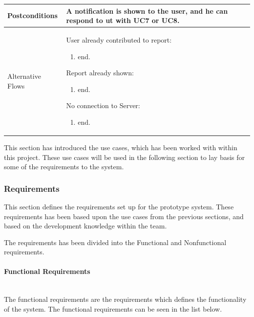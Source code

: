 \begin{table}[p]
\begin{tabularx}{\textwidth}{|l|X|}
Postconditions    & A notification is shown to the user, and he can respond to ut with UC7 or UC8. \\ \hline
Alternative Flows & 
User already contributed to report:
{\footnotesize \begin{enumerate}
\item end.
\end{enumerate}}
Report already shown:
{\footnotesize \begin{enumerate}
\item end.
\end{enumerate}}
No connection to Server:
{\footnotesize \begin{enumerate}
\item end.
\end{enumerate}}
\\ \hline
\end{tabularx}
\end{table}

This section has introduced the use cases, which has been worked with within this project. These use cases will be used in the following section to lay basis for some of the requirements to the system.

\subsubsection{Requirements}
This section defines the requirements set up for the prototype system. These requirements has been based upon the use cases from the previous sections, and based on the development knowledge within the team.

The requirements has been divided into the Functional and Nonfunctional requirements.

\paragraph{Functional Requirements}~\\
The functional requirements are the requirements which defines the functionality of the system. The functional requirements can be seen in the list below.

